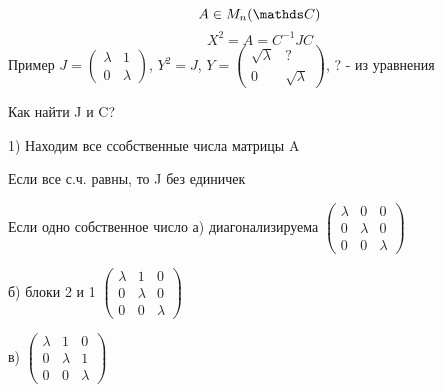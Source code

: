 \documentclass[12pt, fleqn]{article}
\begin{document}
\begin{Example}
    \[A \in M_n(\CC)\]
    \[X^2=A=C^{-1}J C\]
    Пример $J=\begin{pmatrix}
      \lambda & 1\\
      0 & \lambda
    \end{pmatrix}$, $Y^2=J$, $Y=\begin{pmatrix}
      \sqrt{\lambda} & ?\\
      0 & \sqrt{\lambda}
    \end{pmatrix}$, ? - из уравнения
\end{Example}

Как найти J и C?

1) Находим все ссобственные числа матрицы A

Если все с.ч. равны, то J без единичек

Если одно собственное число
а) диагонализируема
$\begin{pmatrix}
\lambda & 0 & 0\\
0 & \lambda & 0\\
0 & 0 & \lambda
\end{pmatrix}$

б) блоки 2 и 1
$\begin{pmatrix}
\lambda & 1 & 0\\
0 & \lambda & 0\\
0 & 0 & \lambda
\end{pmatrix}$

в) $\begin{pmatrix}
\lambda & 1 & 0\\
0 & \lambda & 1\\
0 & 0 & \lambda
\end{pmatrix}$
\end{document}
